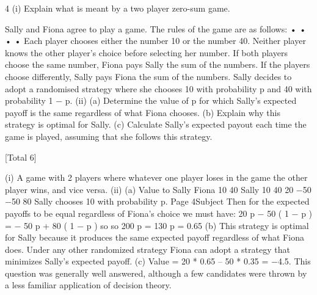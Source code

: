 \documentclass[a4paper,12pt]{article}
\begin{document}
4
(i)
Explain what is meant by a two player zero-sum game.

Sally and Fiona agree to play a game. The rules of the game are as follows:
•
•
•
•
Each player chooses either the number 10 or the number 40.
Neither player knows the other player’s choice before selecting her number.
If both players choose the same number, Fiona pays Sally the sum of the numbers.
If the players choose differently, Sally pays Fiona the sum of the numbers.
Sally decides to adopt a randomised strategy where she chooses 10 with probability p
and 40 with probability 1 − p.
(ii)
(a) Determine the value of p for which Sally’s expected payoff is the same
regardless of what Fiona chooses.
(b) Explain why this strategy is optimal for Sally.
(c) Calculate Sally’s expected payout each time the game is played,
assuming that she follows this strategy.

[Total 6]



(i) A game with 2 players where whatever one player loses in the game the other
player wins, and vice versa.
(ii) (a)
Value to Sally
Fiona
10
40
Sally
10
40
20
−50
−50 80
Sally chooses 10 with probability p.
Page 4Subject %
Then for the expected payoffs to be equal regardless of Fiona’s choice
we must have:
20 p − 50 ( 1 − p ) = − 50 p + 80 ( 1 − p )
so
so
200 p = 130
p = 0.65
(b) This strategy is optimal for Sally because it produces the same
expected payoff regardless of what Fiona does. Under any other
randomized strategy Fiona can adopt a strategy that minimizes Sally’s
expected payoff.
(c) Value = 20 * 0.65 – 50 * 0.35 = −4.5.
This question was generally well answered, although a few candidates were thrown by a less
familiar application of decision theory.
\end{document}
